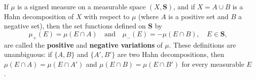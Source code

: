 If $\mu$ is a signed measure on a measurable space $(X, \mathbf{S})$, and if $X = A \cup B$ is a Hahn decomposition of $X$ with respect to $\mu$ (where $A$ is a positive set and $B$ a negative set), then the set functions defined on $\mathbf{S}$ by
$$\mu_+(E) = \mu(E \cap A) \quad \text{and} \quad \mu_-(E) = -\mu(E \cap B), \quad E \in \mathbf{S},$$
are called the \textbf{positive} and \textbf{negative variations} of $\mu$. These definitions are unambiguous: if $\{A, B\}$ and $\{A', B'\}$ are two Hahn decompositions, then $\mu(E \cap A) = \mu(E \cap A')$ and $\mu(E \cap B) = \mu(E \cap B')$ for every measurable $E$.
